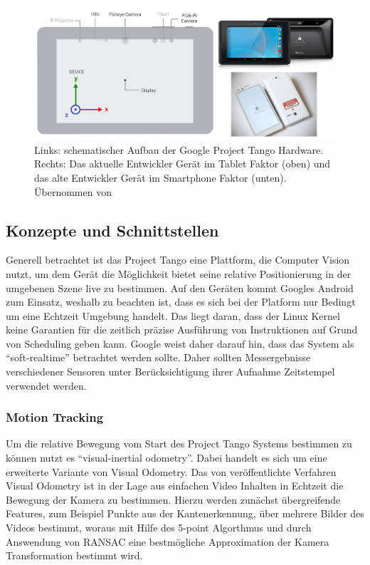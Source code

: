 \begin{figure}[h]
  \centering
	\includegraphics[width=1.0\textwidth]{content/images/theory/tango-device.png} 
  \caption{Links: schematischer Aufbau der Google Project Tango Hardware. Rechts: Das aktuelle Entwickler Gerät im Tablet Faktor (oben) und das alte Entwickler Gerät im Smartphone Faktor (unten). Übernommen von \citet{GoogleDevelopers:online}}
  \label{fig:tango-device}
\end{figure}

\subsection{Konzepte und Schnittstellen}

Generell betrachtet ist das Project Tango eine Plattform, die Computer Vision nutzt, um dem Gerät die Möglichkeit bietet seine relative Positionierung in der umgebenen Szene live zu bestimmen. Auf den Geräten kommt Googles Android zum Einsatz, weshalb zu beachten ist, dass es sich bei der Platform nur Bedingt um eine Echtzeit Umgebung handelt. Das liegt daran, dass der Linux Kernel keine Garantien für die zeitlich präzise Ausführung von Instruktionen  auf Grund von Scheduling geben kann. Google weist daher darauf hin, dass das System als \enquote{soft-realtime} betrachtet werden sollte. Daher sollten Messergebnisse verschiedener Sensoren unter Berücksichtigung ihrer Aufnahme Zeitstempel verwendet werden. \citep{GoogleDevelopersConcepts:online} \\

\subsubsection{Motion Tracking}

Um die relative Bewegung vom Start des Project Tango Systems bestimmen zu können nutzt es \enquote{visual-inertial odometry}. \citep{GoogleDevelopersConcepts:online}
Dabei handelt es sich um eine erweiterte Variante von Visual Odometry. 
Das von \citet{nister2004visual} veröffentlichte Verfahren Visual Odometry ist in der Lage aus einfachen Video Inhalten in Echtzeit die Bewegung der Kamera zu bestimmen. 
Hierzu werden zunächst übergreifende Features, zum Beispiel Punkte aus der \citet{harris1988combined} Kantenerkennung, über mehrere Bilder des Videos bestimmt, woraus mit Hilfe des 5-point Algorthmus und durch Answendung von RANSAC eine bestmögliche Approximation der Kamera Transformation bestimmt wird. \citep{nister2004visual} \\

